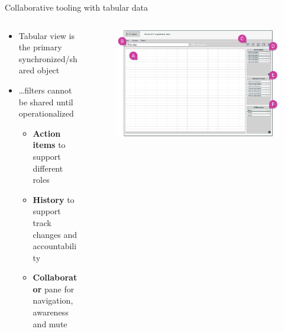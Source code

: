 \documentclass[aspectratio=169]{beamer}
\begin{document}
\begin{frame}{Collaborative tooling with tabular data}
    \begin{columns}
        \begin{column}{0.4\textwidth}
            \begin{itemize}
                \small
                \item Tabular view is the primary synchronized/shared object
                \item \dots filters cannot be shared until operationalized
                \begin{itemize}
                    \scriptsize
                    \vspace{0.4em}
                    \item \textbf{Action items} to support different roles
                    \vspace{0.2em}
                    \item \textbf{History} to support track changes and accountability
                    \vspace{0.2em}
                    \item \textbf{Collaborator} pane for navigation, awareness and mute
                \end{itemize}
            \end{itemize}
        \end{column}
        \begin{column}{0.6\textwidth}
            \begin{figure}[h]
                \centering
                \includegraphics[width=1\textwidth]{images/filter-view-with-marks.png}
            \end{figure}
        \end{column}
    \end{columns}
\end{frame}
\end{document}
